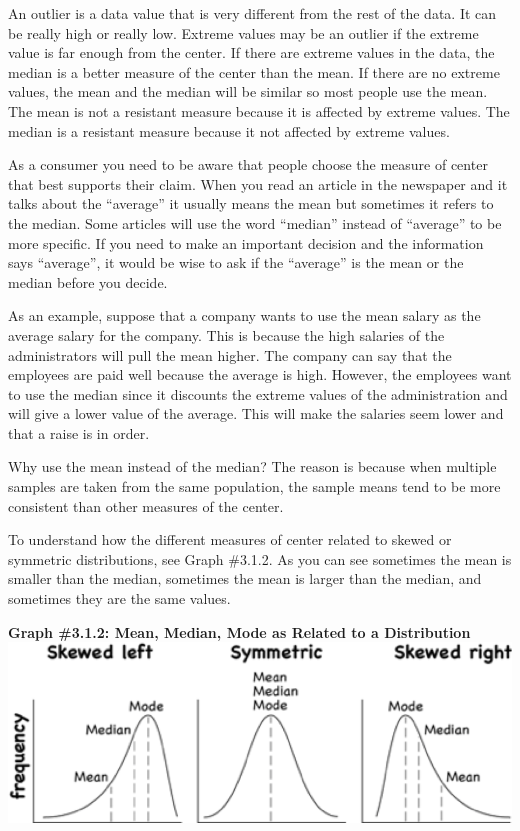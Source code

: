\documentclass[]{book}
\begin{document}
An outlier is a data value that is very different from the rest of the data. It can be really high or really low. Extreme values may be an outlier if the extreme value is far enough from the center. If there are extreme values in the data, the median is a better measure of the center than the mean. If there are no extreme values, the mean and the median will be similar so most people use the mean. The mean is not a resistant measure because it is affected by extreme values. The median is a resistant measure because it not affected by extreme values.

As a consumer you need to be aware that people choose the measure of center that best supports their claim. When you read an article in the newspaper and it talks about the ``average'' it usually means the mean but sometimes it refers to the median. Some articles will use the word ``median'' instead of ``average'' to be more specific. If you need to make an important decision and the information says ``average'', it would be wise to ask if the ``average'' is the mean or the median before you
decide.

As an example, suppose that a company wants to use the mean salary as the average salary for the company. This is because the high salaries of the administrators will pull the mean higher. The company can say that the employees are paid well because the average is high. However, the employees want to use the median since it discounts the extreme values of the administration and will give a lower value of the average. This will make the salaries seem lower and that a raise is in order.

Why use the mean instead of the median? The reason is because when multiple samples are taken from the same population, the sample means tend to be more consistent than other measures of the center.

To understand how the different measures of center related to skewed or symmetric distributions, see Graph \#3.1.2. As you can see sometimes the mean is smaller than the median, sometimes the mean is
larger than the median, and sometimes they are the same values.

\textbf{Graph \#3.1.2: Mean, Median, Mode as Related to a Distribution}
\includegraphics{centers_distribution.png}
\end{document}

